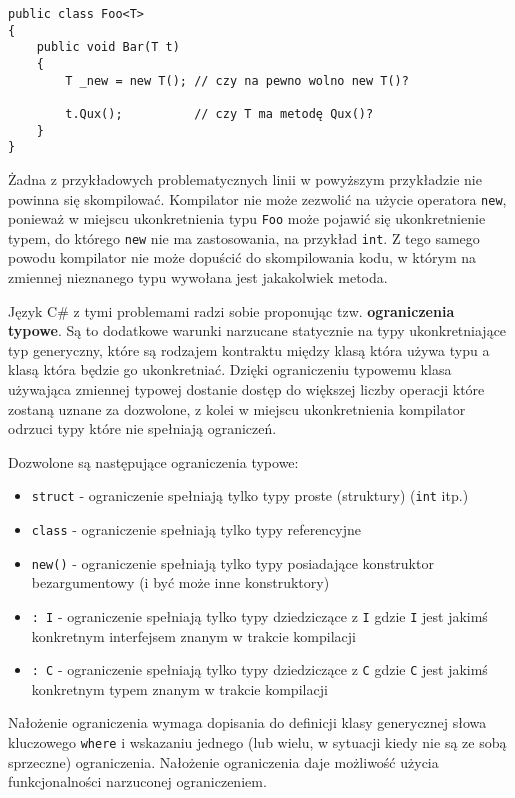 \begin{scriptsize}
\begin{verbatim}
public class Foo<T>
{
    public void Bar(T t)
    {
        T _new = new T(); // czy na pewno wolno new T()?

        t.Qux();          // czy T ma metodę Qux()?
    }
}
\end{verbatim}
\end{scriptsize}

Żadna z przykładowych problematycznych linii w powyższym przykładzie nie powinna się skompilować. 
Kompilator nie może zezwolić na użycie operatora {\tt new}, ponieważ w miejscu ukonkretnienia typu {\tt Foo} może 
pojawić się ukonkretnienie typem, do którego {\tt new} nie ma zastosowania, na przykład {\tt int}. Z tego samego
powodu kompilator nie może dopuścić do skompilowania kodu, w którym na zmiennej nieznanego typu wywołana jest jakakolwiek metoda.

Język C\# z tymi problemami radzi sobie proponując tzw. {\bf ograniczenia typowe}. Są to dodatkowe warunki narzucane
statycznie na typy ukonkretniające typ generyczny, które są rodzajem kontraktu między klasą która używa typu
a klasą która będzie go ukonkretniać. Dzięki ograniczeniu typowemu klasa używająca zmiennej typowej dostanie dostęp
do większej liczby operacji które zostaną uznane za dozwolone, z kolei w miejscu ukonkretnienia kompilator
odrzuci typy które nie spełniają ograniczeń.

Dozwolone są następujące ograniczenia typowe:
\begin{itemize}
\item {\tt struct} - ograniczenie spełniają tylko typy proste (struktury) ({\tt int} itp.)
\item {\tt class} - ograniczenie spełniają tylko typy referencyjne
\item {\tt new()} - ograniczenie spełniają tylko typy posiadające konstruktor bezargumentowy (i być może inne konstruktory)
\item {\tt : I} - ograniczenie spełniają tylko typy dziedziczące z {\tt I} gdzie {\tt I} jest jakimś konkretnym interfejsem znanym w trakcie kompilacji
\item {\tt : C} - ograniczenie spełniają tylko typy dziedziczące z {\tt C} gdzie {\tt C} jest jakimś konkretnym typem znanym w trakcie kompilacji
\end{itemize}

Nałożenie ograniczenia wymaga dopisania do definicji klasy generycznej słowa kluczowego {\tt where} i wskazaniu jednego 
(lub wielu, w sytuacji kiedy nie są ze sobą sprzeczne) ograniczenia. Nałożenie ograniczenia daje możliwość użycia
funkcjonalności narzuconej ograniczeniem.

